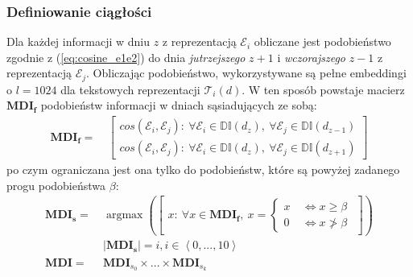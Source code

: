 \subsubsection{Definiowanie ciągłości}
Dla każdej informacji w dniu $z$ z reprezentacją $\mathcal{E}_{i}$ obliczane jest podobieństwo 
zgodnie z (\ref{eq:cosine_e1e2}) do dnia \textit{jutrzejszego} $z+1$ i \textit{wczorajszego} 
$z-1$ z reprezentacją $\mathcal{E}_{j}$. Obliczając podobieństwo, wykorzystywane są pełne 
embeddingi o $l=1024$ dla tekstowych reprezentacji $\mathcal{T}_{i}(d)$. W ten sposób powstaje
macierz $\mathbf{MDI_f}$ podobieństw informacji w dniach sąsiadujących ze sobą:
\begin{equation}
    \begin{aligned}
        \mathbf{MDI_f} = \: & 
        \left[ 
            \begin{array}{c}
                cos(\mathcal{E}_{i}, \mathcal{E}_{j}): \: 
                    \forall \mathcal{E}_{i} \in \mathbb{DI}(d_{z}), \:
                    \forall \mathcal{E}_{j} \in \mathbb{DI}(d_{z-1})
                \\ 
                cos(\mathcal{E}_{i}, \mathcal{E}_{j}): \: 
                    \forall \mathcal{E}_{i} \in \mathbb{DI}(d_{z}), \:
                    \forall \mathcal{E}_{j} \in \mathbb{DI}(d_{z+1})
            \end{array} 
        \right]
    \end{aligned}
\end{equation}
po czym ograniczana jest ona tylko do podobieństw, które są powyżej zadanego progu podobieństwa $\beta$:
\begin{equation} \label{eq:ci_sim_matrix_cos}
    \begin{aligned}
        \mathbf{MDI_s} = \: & 
        \operatorname*{argmax} 
        \left(
            \left[ 
                \begin{array}{c}
                    x: \: \forall x \in \mathbf{MDI_f}, \: 
                    x = \begin{cases}
                        x \: & \iff x \geq \beta 
                        \\
                        0 \: & \iff x \ngtr \beta
                    \end{cases} 
                \end{array}
            \right]
        \right) 
        \\
        & |\mathbf{MDI_s}| = i, i \in \left<0, ..., 10\right>
        \\
        \mathbf{MDI} = \: & \mathbf{MDI}_{s_0} \times ... \times \mathbf{MDI}_{s_k}
    \end{aligned}
\end{equation}
